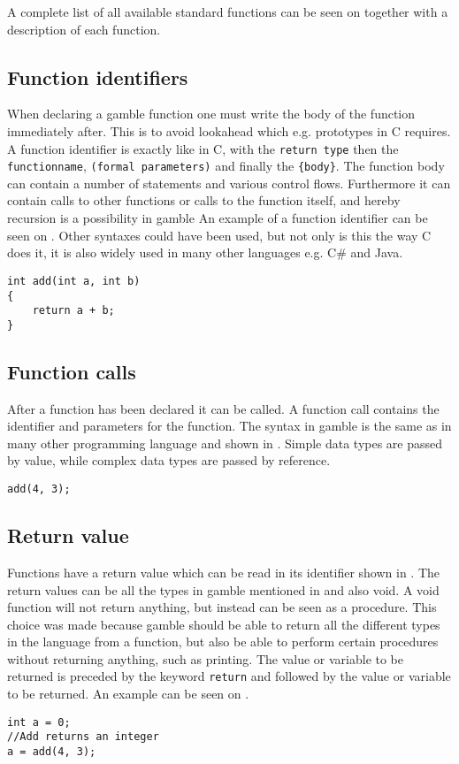 A complete list of all available standard functions can be seen on  together with a description of each function.


\subsection*{Function identifiers}
When declaring a \gls{gamble} function one must write the body of the function immediately after.
This is to avoid lookahead which e.g. prototypes in C requires.
A function identifier is exactly like in C, with the \texttt{return type} then the \texttt{functionname}, \texttt{(formal parameters)} and finally the \texttt{\{body\}}. %
The function body can contain a number of statements and various control flows.
Furthermore it can contain calls to other functions or calls to the function itself, and hereby recursion is a possibility in \gls{gamble}
An example of a function identifier can be seen on .
Other syntaxes could have been used, but not only is this the way C does it, it is also widely used in many other languages e.g. C\# and Java.

\begin{lstlisting}[caption={Function Identifier},label={lst:functionID},numbers=none]                                                        
int add(int a, int b)
{
    return a + b;
}
\end{lstlisting}

\subsection*{Function calls}
After a function has been declared it can be called. 
A function call contains the identifier and parameters for the function. 
The syntax in \gls{gamble} is the same as in many other programming language and shown in .
Simple data types are passed by value, while complex data types are passed by reference. 

\begin{lstlisting}[caption={A function call in \gls{gamble}},label={lst:functionCall},numbers=none]
add(4, 3);
\end{lstlisting}


\subsection*{Return value}
Functions have a return value which can be read in its identifier shown in .
The return values can be all the types in \gls{gamble} mentioned in  and also void. 
A void function will not return anything, but instead can be seen as a procedure.
This choice was made because \gls{gamble} should be able to return all the different types in the language from a function, but also be able to perform certain procedures without returning anything, such as printing.
The value or variable to be returned is preceded by the keyword \texttt{return} and followed by the value or variable to be returned.
An example can be seen on .

\begin{lstlisting}[caption={Return Function},label={lst:returnFunction},numbers=none]
int a = 0;
//Add returns an integer
a = add(4, 3); 
\end{lstlisting}

